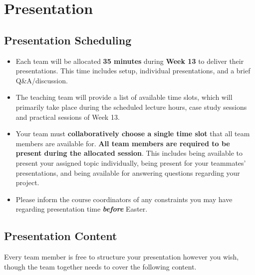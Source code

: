 \documentclass{csse4400}
\begin{document}
\section{Presentation}

\subsection{Presentation Scheduling}

\begin{itemize}
  \item Each team will be allocated \textbf{35 minutes} during \textbf{Week 13} to deliver their presentations. This time includes setup, individual presentations, and a brief Q\&A/discussion.
  \item The teaching team will provide a list of available time slots, which will primarily take place during the scheduled lecture hours, case study sessions and practical sessions of Week 13.
  \item Your team must \textbf{collaboratively choose a single time slot} that all team members are available for. \textbf{All team members are required to be present during the allocated session}. This includes being available to present your assigned topic individually, being present for your teammates' presentations, and being available for answering questions regarding your project.
  \item Please inform the course coordinators of any constraints you may have regarding presentation time \textbf{\textit{before}} Easter.
\end{itemize}






\subsection{Presentation Content}

Every team member is free to structure your presentation however you wish, though the team together needs to cover the following content.
\end{document}
